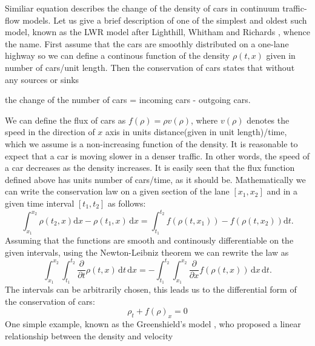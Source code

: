 \documentclass[a4paper,12pt,twoside]{report}%
\begin{document}
Similiar equation describes the change of the density of cars in continuum traffic-flow models. Let us give a brief description of one of the simplest and oldest such model, known as the LWR model after Lighthill, Whitham \cite{lighthillwitham} and Richards \cite{richards}, whence the name. First assume that the cars are smoothly distributed on a one-lane highway so we can define a continous function of the density $ \rho (t,x) $ given in number of cars/unit length. Then the conservation of cars states that without any sources or sinks
\begin{center}
	the change of the number of cars = incoming cars - outgoing cars.
\end{center}
We can define the flux of cars as $ f(\rho) = \rho v(\rho) $, where $ v(\rho) $  denotes the speed in the direction of $ x $ axis in units distance(given in unit length)/time, which we assume is a non-increasing function of the density. It is reasonable to expect that a car is moving slower in a denser traffic. In other words, the speed of a car decreases as the density increases. It is easily seen that the flux function defined above has units number of cars/time, as it should be. Mathematically we can write the conservation law on a given section of the lane $ \left[x_1, x_2\right] $ and in a given time interval $ [t_1, t_2] $ as follows:
\[
\int_{x_1}^{x_2} \rho (t_2,x) \mathrm{d}x - \rho (t_1,x)\,\mathrm{d}x = \int_{t_1}^{t_2} f(\rho(t,x_1)) - f\left(\rho(t,x_2)\right)\mathrm{d}t.
\]
Assuming that the functions are smooth and continously differentiable on the given intervals, using the Newton-Leibniz theorem we can rewrite the law as
\[
\int_{x_1}^{x_2} \int_{t_1}^{t_2} \frac{\partial}{\partial t}\rho(t,x) \,\mathrm{d}t\, \mathrm{d}x = -\int_{t_1}^{t_2} \int_{x_1}^{x_2} \frac{\partial}{\partial x} f\left(\rho(t,x)\right)\, \mathrm{d}x\, \mathrm{d}t.
\]
The intervals can be arbitrarily chosen, this leads us to the differential form of the conservation of cars:
\begin{equation}
	\rho_t + f(\rho)_x = 0
	\label{conservation}
\end{equation}
One simple example, known as the Greenshield's model \cite{greenshields}, who proposed a linear relationship between the density and velocity
\end{document}

